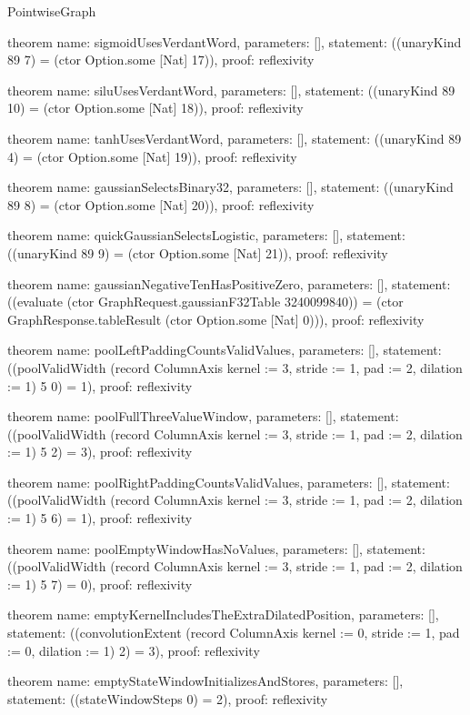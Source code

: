 \begin{lexlean}{PointwiseGraph}
\begin{semanticmodule}
theorem{
  name: sigmoidUsesVerdantWord,
  parameters: [],
  statement: ((unaryKind 89 7) = (ctor Option.some [Nat] 17)),
  proof: reflexivity{}
}

theorem{
  name: siluUsesVerdantWord,
  parameters: [],
  statement: ((unaryKind 89 10) = (ctor Option.some [Nat] 18)),
  proof: reflexivity{}
}

theorem{
  name: tanhUsesVerdantWord,
  parameters: [],
  statement: ((unaryKind 89 4) = (ctor Option.some [Nat] 19)),
  proof: reflexivity{}
}

theorem{
  name: gaussianSelectsBinary32,
  parameters: [],
  statement: ((unaryKind 89 8) = (ctor Option.some [Nat] 20)),
  proof: reflexivity{}
}

theorem{
  name: quickGaussianSelectsLogistic,
  parameters: [],
  statement: ((unaryKind 89 9) = (ctor Option.some [Nat] 21)),
  proof: reflexivity{}
}

theorem{
  name: gaussianNegativeTenHasPositiveZero,
  parameters: [],
  statement: ((evaluate (ctor GraphRequest.gaussianF32Table 3240099840)) = (ctor GraphResponse.tableResult (ctor Option.some [Nat] 0))),
  proof: reflexivity{}
}

theorem{
  name: poolLeftPaddingCountsValidValues,
  parameters: [],
  statement: ((poolValidWidth (record ColumnAxis {kernel := 3, stride := 1, pad := 2, dilation := 1}) 5 0) = 1),
  proof: reflexivity{}
}

theorem{
  name: poolFullThreeValueWindow,
  parameters: [],
  statement: ((poolValidWidth (record ColumnAxis {kernel := 3, stride := 1, pad := 2, dilation := 1}) 5 2) = 3),
  proof: reflexivity{}
}

theorem{
  name: poolRightPaddingCountsValidValues,
  parameters: [],
  statement: ((poolValidWidth (record ColumnAxis {kernel := 3, stride := 1, pad := 2, dilation := 1}) 5 6) = 1),
  proof: reflexivity{}
}

theorem{
  name: poolEmptyWindowHasNoValues,
  parameters: [],
  statement: ((poolValidWidth (record ColumnAxis {kernel := 3, stride := 1, pad := 2, dilation := 1}) 5 7) = 0),
  proof: reflexivity{}
}

theorem{
  name: emptyKernelIncludesTheExtraDilatedPosition,
  parameters: [],
  statement: ((convolutionExtent (record ColumnAxis {kernel := 0, stride := 1, pad := 0, dilation := 1}) 2) = 3),
  proof: reflexivity{}
}

theorem{
  name: emptyStateWindowInitializesAndStores,
  parameters: [],
  statement: ((stateWindowSteps 0) = 2),
  proof: reflexivity{}
}


\end{semanticmodule}
\end{lexlean}
